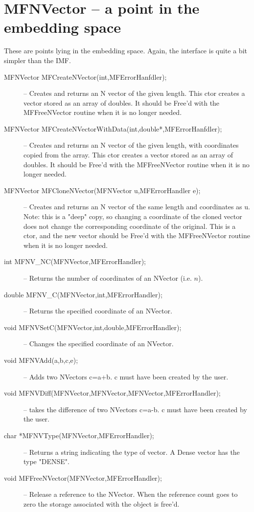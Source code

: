 \documentclass[12pt]{article}
\begin{document}
\section{MFNVector -- a point in the embedding space}
    These are points lying in the embedding space. Again, the interface is quite a bit simpler than the IMF.
\begin{description}
\item [MFNVector MFCreateNVector(int,MFErrorHanfdler);]
-- Creates and returns an N vector of the given length. This ctor creates a
vector stored as an array of doubles.
It should be Free'd with the MFFreeNVector routine when it is no longer needed.
\item [MFNVector MFCreateNVectorWithData(int,double*,MFErrorHanfdler);]
-- Creates and returns an N vector of the given length, with coordinates copied
from the array. This ctor creates a vector stored as an array of doubles.
It should be Free'd with the MFFreeNVector routine when it is no longer needed.
\item [MFNVector MFCloneNVector(MFNVector u,MFErrorHandler e);]
-- Creates and returns an N vector of the same length and coordinates as {u}.
Note: this is a "deep" copy, so changing a coordinate of the cloned vector
does not change the corresponding coordinate of the original.
This is a ctor, and the new vector should be Free'd with the MFFreeNVector routine when it is no longer needed.
\item [int MFNV\_NC(MFNVector,MFErrorHandler);]
-- Returns the number of coordinates of an NVector (i.e. $n$).
\item [double MFNV\_C(MFNVector,int,MFErrorHandler);]
-- Returns the specified coordinate of an NVector.
\item [void MFNVSetC(MFNVector,int,double,MFErrorHandler);]
-- Changes the specified coordinate of an NVector.
\item [void MFNVAdd(a,b,c,e);]
-- Adds two NVectors {c=a+b}. {c} must have been created by the user.
\item [void MFNVDiff(MFNVector,MFNVector,MFNVector,MFErrorHandler);]
-- takes the difference of two NVectors {c=a-b}. {c} must have been created by the user.
\item [char *MFNVType(MFNVector,MFErrorHandler);]
-- Returns a string indicating the type of vector. A Dense vector has the type {"DENSE"}.
\item [void MFFreeNVector(MFNVector,MFErrorHandler);]
-- Release a reference to the NVector. When the reference count goes to zero the
   storage associated with the object is free'd.
\end{description}
\end{document}
